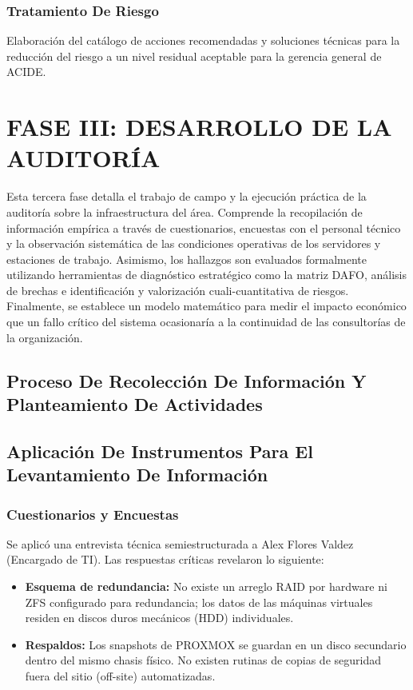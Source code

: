 \documentclass[12pt]{article}
\begin{document}
\subsubsection{Tratamiento De Riesgo}
Elaboración del catálogo de acciones recomendadas y soluciones técnicas para la reducción del riesgo a un nivel residual aceptable para la gerencia general de ACIDE.

\clearpage
\section{FASE III: DESARROLLO DE LA AUDITORÍA}

Esta tercera fase detalla el trabajo de campo y la ejecución práctica de la auditoría sobre la infraestructura del área. Comprende la recopilación de información empírica a través de cuestionarios, encuestas con el personal técnico y la observación sistemática de las condiciones operativas de los servidores y estaciones de trabajo. Asimismo, los hallazgos son evaluados formalmente utilizando herramientas de diagnóstico estratégico como la matriz DAFO, análisis de brechas e identificación y valorización cuali-cuantitativa de riesgos. Finalmente, se establece un modelo matemático para medir el impacto económico que un fallo crítico del sistema ocasionaría a la continuidad de las consultorías de la organización.

\subsection{Proceso De Recolección De Información Y Planteamiento De Actividades}

\subsection{Aplicación De Instrumentos Para El Levantamiento De Información}
\subsubsection{Cuestionarios y Encuestas}
Se aplicó una entrevista técnica semiestructurada a Alex Flores Valdez (Encargado de TI). Las respuestas críticas revelaron lo siguiente:
\begin{itemize}
    \item \textbf{Esquema de redundancia:} No existe un arreglo RAID por hardware ni ZFS configurado para redundancia; los datos de las máquinas virtuales residen en discos duros mecánicos (HDD) individuales.
    \item \textbf{Respaldos:} Los snapshots de PROXMOX se guardan en un disco secundario dentro del mismo chasis físico. No existen rutinas de copias de seguridad fuera del sitio (off-site) automatizadas.
\end{itemize}
\end{document}

